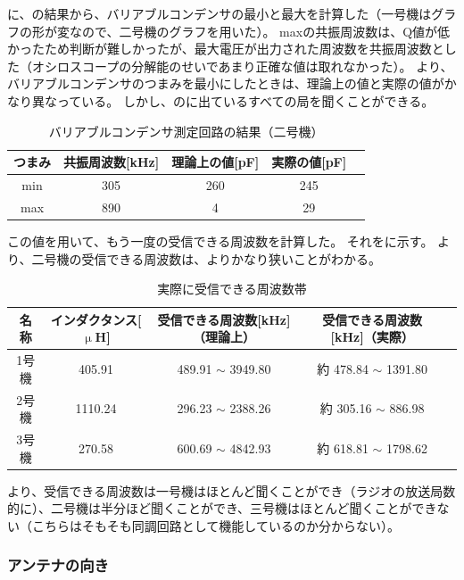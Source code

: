 \documentclass[report.tex]{subfiles}
\begin{document}
に、の結果から、バリアブルコンデンサの最小と最大を計算した（一号機はグラフの形が変なので、二号機のグラフを用いた）。
maxの共振周波数は、Q値が低かったため判断が難しかったが、最大電圧が出力された周波数を共振周波数とした（オシロスコープの分解能のせいであまり正確な値は取れなかった）。
より、バリアブルコンデンサのつまみを最小にしたときは、理論上の値と実際の値がかなり異なっている。
しかし、のに出ているすべての局を聞くことができる。

\begin{table}[H]
	\centering
	\caption{バリアブルコンデンサ測定回路の結果（二号機）}
	\label{tab:ant3}
	\begin{tabular}{ccccc} \hline
		つまみ & 共振周波数[kHz] & 理論上の値[pF] & 実際の値[pF] \\ \hline
		min & 305        & 260       & 245      \\
		max & 890        & 4         & 29       \\ \hline
	\end{tabular}
\end{table}

この値を用いて、もう一度の受信できる周波数を計算した。
それをに示す。
より、二号機の受信できる周波数は、よりかなり狭いことがわかる。

\begin{table}[H]
	\centering
	\caption{実際に受信できる周波数帯}
	\label{tab:ant5}
	\begin{tabular}{ccccc} \hline
		名称  & インダクタンス[\(\upmu\)H] & 受信できる周波数[kHz]（理論上）      & 受信できる周波数[kHz]（実際）         \\ \hline
		1号機 & 405.91              & 489.91 \(\sim\) 3949.80 & 約 478.84 \(\sim\) 1391.80 \\
		2号機 & 1110.24             & 296.23 \(\sim\) 2388.26 & 約 305.16 \(\sim\) 886.98  \\
		3号機 & 270.58              & 600.69 \(\sim\) 4842.93 & 約 618.81 \(\sim\) 1798.62 \\ \hline
	\end{tabular}
\end{table}

より、受信できる周波数は一号機はほとんど聞くことができ（ラジオの放送局数的に）、二号機は半分ほど聞くことができ、三号機はほとんど聞くことができない（こちらはそもそも同調回路として機能しているのか分からない）。

\subsubsection{アンテナの向き}
\end{document}

